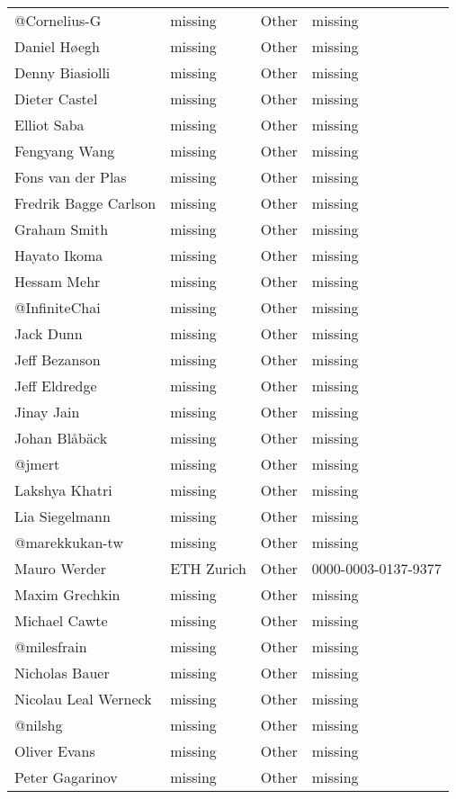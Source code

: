\begin{longtable}{p{4cm}p{4cm}ll}
  @Cornelius-G & missing & Other & missing \\
  Daniel Høegh & missing & Other & missing \\
  Denny Biasiolli & missing & Other & missing \\
  Dieter Castel & missing & Other & missing \\
  Elliot Saba & missing & Other & missing \\
  Fengyang Wang & missing & Other & missing \\
  Fons van der Plas & missing & Other & missing \\
  Fredrik Bagge Carlson & missing & Other & missing \\
  Graham Smith & missing & Other & missing \\
  Hayato Ikoma & missing & Other & missing \\
  Hessam Mehr & missing & Other & missing \\
  @InfiniteChai & missing & Other & missing \\
  Jack Dunn & missing & Other & missing \\
  Jeff Bezanson & missing & Other & missing \\
  Jeff Eldredge & missing & Other & missing \\
  Jinay Jain & missing & Other & missing \\
  Johan Blåbäck & missing & Other & missing \\
  @jmert & missing & Other & missing \\
  Lakshya Khatri & missing & Other & missing \\
  Lia Siegelmann & missing & Other & missing \\
  @marekkukan-tw & missing & Other & missing \\
  Mauro Werder & ETH Zurich & Other & 0000-0003-0137-9377 \\
  Maxim Grechkin & missing & Other & missing \\
  Michael Cawte & missing & Other & missing \\
  @milesfrain & missing & Other & missing \\
  Nicholas Bauer & missing & Other & missing \\
  Nicolau Leal Werneck & missing & Other & missing \\
  @nilshg & missing & Other & missing \\
  Oliver Evans & missing & Other & missing \\
  Peter Gagarinov & missing & Other & missing \\

\end{longtable}
